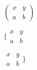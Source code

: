 \documentclass{article}
\begin{document}

$( \begin{array}{cc} x & y \\ a & b \end{array} )$


$\{ \begin{array}{cc} x & y \\ a & b \end{array} $


$ \begin{array}{cc} x & y \\ a & b \end{array} \} $
\end{document}
